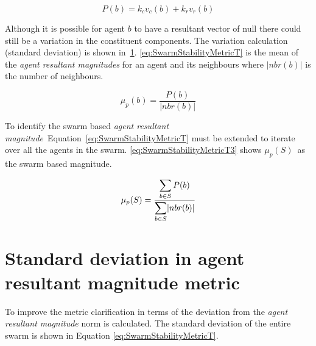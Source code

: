 \documentclass[10pt,journal,letterpaper,twoside]{IEEEtran}
\begin{document}
\begin{equation}
\label{eq:BotStabilityT}
P(b) = k_cv_c(b) + k_r v_r(b)
\end{equation}

Although it is possible for agent $b$ to have a resultant vector of null there could still be a variation in the constituent components. The variation calculation (standard deviation) is shown in~\ref{Section:VarianceInPotential}. \ref{eq:SwarmStabilityMetricT} is the mean of the \textit{agent resultant magnitudes} for an agent and its neighbours where $|nbr(b)|$ is the number of neighbours.

\begin{equation}
\label{eq:SwarmStabilityMetricT}
\mu_p(b) = \frac{P(b)}{|nbr(b)|}
\end{equation}


To identify the swarm based \textit{agent resultant magnitude}~Equation~\ref{eq:SwarmStabilityMetricT} must be extended to iterate over all the agents in the swarm. \ref{eq:SwarmStabilityMetricT3} shows $\mu_p(S)$~as the swarm based magnitude.

\begin{equation}
\label{eq:SwarmStabilityMetricT3}
\mu_p(S) = \frac{\mathlarger{\sum_{b \in S} P(b)}}{\mathlarger{\sum_{b \in S}}|nbr(b)|}
\end{equation}

\section{Standard deviation in agent resultant magnitude metric}\label{Section:VarianceInPotential}
To improve the metric clarification in terms of the deviation from the \textit{agent resultant magnitude} norm is calculated. The standard deviation of the entire swarm  is shown in Equation \ref{eq:SwarmStabilityMetricT}.
\end{document}
